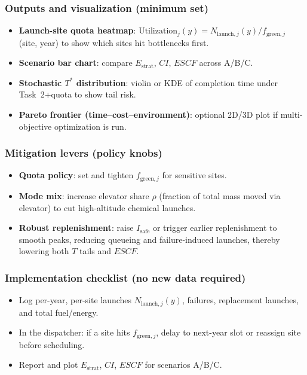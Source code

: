 ﻿\documentclass{mcmthesis}
\begin{document}
\subsubsection{Outputs and visualization (minimum set)}
\begin{itemize}
\item \textbf{Launch-site quota heatmap}: $ \text{Utilization}_j(y)=N_{\text{launch},j}(y)/f_{\text{green},j}$ (site, year) to show which sites hit bottlenecks first.
    \item \textbf{Scenario bar chart}: compare $E_{\text{strat}}$, $CI$, $ESCF$ across A/B/C.
    \item \textbf{Stochastic $T^*$ distribution}: violin or KDE of completion time under Task~2+quota to show tail risk.
    \item \textbf{Pareto frontier (time–cost–environment)}: optional 2D/3D plot if multi-objective optimization is run.
\end{itemize}

\subsubsection{Mitigation levers (policy knobs)}
\begin{itemize}
\item \textbf{Quota policy}: set and tighten $f_{\text{green},j}$ for sensitive sites.
\item \textbf{Mode mix}: increase elevator share $\rho$ (fraction of total mass moved via elevator) to cut high-altitude chemical launches.
    \item \textbf{Robust replenishment}: raise $I_{\text{safe}}$ or trigger earlier replenishment to smooth peaks, reducing queueing and failure-induced launches, thereby lowering both $T$ tails and $ESCF$.
\end{itemize}

\subsubsection{Implementation checklist (no new data required)}
\begin{itemize}
\item Log per-year, per-site launches $N_{\text{launch},j}(y)$, failures, replacement launches, and total fuel/energy.
\item In the dispatcher: if a site hits $f_{\text{green},j}$, delay to next-year slot or reassign site before scheduling.
\item Report and plot $E_{\text{strat}}$, $CI$, $ESCF$ for scenarios A/B/C.
\end{itemize}
\end{document}
